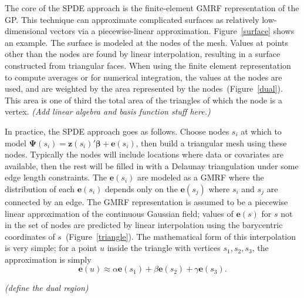 \documentclass[]{interact}
\begin{document}
The core of the SPDE approach is the finite-element GMRF representation of the
GP. This technique can approximate complicated surfaces as relatively
low-dimensional vectors via a piecewise-linear approximation.
Figure~\ref{surface} shows an example. The surface is modeled at the nodes of
the mesh. Values at points other than the nodes are found by linear
interpolation, resulting in a surface constructed from triangular faces. When
using the finite element representation to compute averages or for numerical
integration, the values at the nodes are used, and are weighted by the area
represented by the nodes~(Figure~\ref{dual}). This area is one of third the
total area of the triangles of which the node is a vertex.
{\it (Add linear algebra and basis function stuff here.)}

In practice, the SPDE approach goes as follows. Choose nodes \(s_{i}\)
at which to model \(\boldsymbol{\Psi}(s_{i})
= \mathbf{z}(s_{i})' \boldsymbol{\beta} + \mathbf{e}(s_{i})\), then build a
triangular mesh using these nodes. Typically the nodes will include locations
where data or covariates are available, then the rest will be filled in with a
Delaunay triangulation under some edge length constraints. The
\(\mathbf{e}(s_{i})\) are modeled as a GMRF where the distribution of
each \(\mathbf{e}(s_{i})\) depends only on the
\(\mathbf{e}(s_{j})\) where \(s_{i}\) and \(s_{j}\) are connected by an
edge. The GMRF representation is assumed to be a piecewise linear approximation
of the continuous Gaussian field; values of \(\mathbf{e}(s)\) for
\(s\) not in the set of nodes are predicted by linear interpolation using
the barycentric coordinates of \(s\)~(Figure~\ref{triangle}). The mathematical
form of this interpolation is very simple; for a point \(u\) inside the
triangle with vertices \(s_{1}, s_{2}, s_{3}\), the approximation is simply
\begin{displaymath}
\mathbf{e}(u) \approx \alpha \mathbf{e}(s_{1})
+ \beta \mathbf{e}(s_{2}) + \gamma \mathbf{e}(s_{3}).
\end{displaymath}


{\it (define the dual region)}

\end{document}
